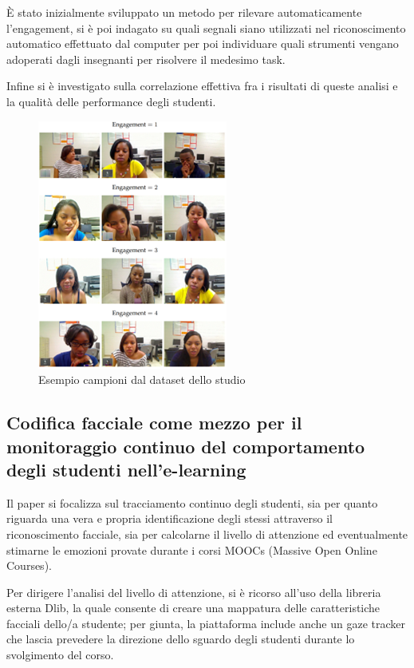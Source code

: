 È stato inizialmente sviluppato un metodo per rilevare automaticamente l’engagement, si è poi indagato su quali segnali siano utilizzati nel riconoscimento automatico effettuato dal computer per poi individuare quali strumenti vengano adoperati dagli insegnanti per risolvere il medesimo task.

Infine si è investigato sulla correlazione effettiva fra i risultati di queste analisi e la qualità delle performance degli studenti.

\begin{figure}
    \begin{center}    
        \includegraphics[width=0.4\linewidth]{images/2.png}
        \caption{Esempio campioni dal dataset dello studio}
    \end{center}
\end{figure}

\subsection{Codifica facciale come mezzo per il monitoraggio continuo del comportamento degli studenti nell'e-learning}

Il paper \cite{FacialCodingContinMonitor} si focalizza sul tracciamento continuo degli studenti, sia per quanto riguarda una vera e propria identificazione degli stessi attraverso il riconoscimento facciale, sia per calcolarne il livello di attenzione ed eventualmente stimarne le emozioni provate durante i corsi MOOCs (Massive Open Online Courses).

Per dirigere l’analisi del livello di attenzione, si è ricorso all’uso della libreria esterna Dlib, la quale consente di creare una mappatura delle caratteristiche facciali dello/a studente; per giunta, la piattaforma include anche un gaze tracker che lascia prevedere la direzione dello sguardo degli studenti durante lo svolgimento del corso.

